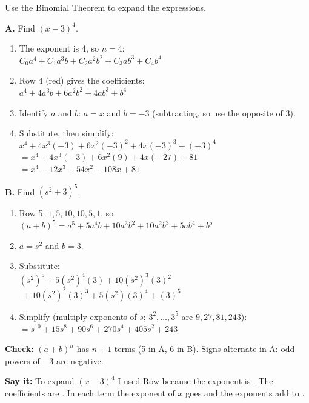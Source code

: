 \vspace{-5pt}
Use the Binomial Theorem to expand the expressions.
\vspace{-4pt}

\begin{minipage}[t]{0.49\textwidth}
\textbf{A.} Find $(x-3)^4$.
\begin{enumerate}[label=\textbf{\arabic*.}, itemsep=0pt]
\item The exponent is 4, so $n=4$:\\ $C_0a^4+C_1a^3b+C_2a^2b^2+C_3ab^3+C_4b^4$
\item Row 4 (red) gives the coefficients:\\ $a^4+4a^3b+6a^2b^2+4ab^3+b^4$
\item Identify $a$ and $b$: $a=x$ and $b=-3$ (subtracting, so use the opposite of 3).
\item Substitute, then simplify:\\
$x^4+4x^3(-3)+6x^2(-3)^2+4x(-3)^3+(-3)^4$\\
$=x^4+4x^3(-3)+6x^2(9)+4x(-27)+81$\\
$=x^4-12x^3+54x^2-108x+81$
\end{enumerate}
\end{minipage}\hfill
\begin{minipage}[t]{0.48\textwidth}
\textbf{B.} Find $(s^2+3)^5$.
\begin{enumerate}[label=\textbf{\arabic*.}, itemsep=0pt]
\item Row 5: $1,5,10,10,5,1$, so\\ $(a+b)^5=a^5+5a^4b+10a^3b^2+10a^2b^3+5ab^4+b^5$
\item $a=s^2$ and $b=3$.
\item Substitute:\\
$(s^2)^5+5(s^2)^4(3)+10(s^2)^3(3)^2$\\
$\;+10(s^2)^2(3)^3+5(s^2)(3)^4+(3)^5$
\item Simplify (multiply exponents of $s$; $3^2,\dots,3^5$ are $9,27,81,243$):\\
$=s^{10}+15s^8+90s^6+270s^4+405s^2+243$
\end{enumerate}
\end{minipage}

{\small\textbf{Check:} $(a+b)^n$ has $n+1$ terms (5 in A, 6 in B). Signs alternate in A: odd powers of $-3$ are negative.}

\textbf{Say it:} To expand $(x-3)^4$ I used Row \blank[1cm] because the exponent is \blank[1cm]. The coefficients are \blank[3.5cm]. In each term the exponent of $x$ goes \blank[2cm] and the exponents add to \blank[1cm].
\lines[1]


